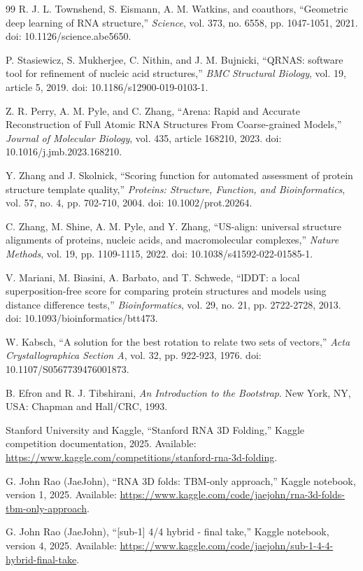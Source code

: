 \begin{thebibliography}{99}
R. J. L. Townshend, S. Eismann, A. M. Watkins, and coauthors,
``Geometric deep learning of RNA structure,''
\emph{Science}, vol. 373, no. 6558, pp. 1047-1051, 2021.
doi: 10.1126/science.abe5650.

P. Stasiewicz, S. Mukherjee, C. Nithin, and J. M. Bujnicki,
``QRNAS: software tool for refinement of nucleic acid structures,''
\emph{BMC Structural Biology}, vol. 19, article 5, 2019.
doi: 10.1186/s12900-019-0103-1.

Z. R. Perry, A. M. Pyle, and C. Zhang,
``Arena: Rapid and Accurate Reconstruction of Full Atomic RNA Structures From Coarse-grained Models,''
\emph{Journal of Molecular Biology}, vol. 435, article 168210, 2023.
doi: 10.1016/j.jmb.2023.168210.

Y. Zhang and J. Skolnick,
``Scoring function for automated assessment of protein structure template quality,''
\emph{Proteins: Structure, Function, and Bioinformatics}, vol. 57, no. 4, pp. 702-710, 2004.
doi: 10.1002/prot.20264.

C. Zhang, M. Shine, A. M. Pyle, and Y. Zhang,
``US-align: universal structure alignments of proteins, nucleic acids, and macromolecular complexes,''
\emph{Nature Methods}, vol. 19, pp. 1109-1115, 2022.
doi: 10.1038/s41592-022-01585-1.

V. Mariani, M. Biasini, A. Barbato, and T. Schwede,
``lDDT: a local superposition-free score for comparing protein structures and models using distance difference tests,''
\emph{Bioinformatics}, vol. 29, no. 21, pp. 2722-2728, 2013.
doi: 10.1093/bioinformatics/btt473.

W. Kabsch,
``A solution for the best rotation to relate two sets of vectors,''
\emph{Acta Crystallographica Section A}, vol. 32, pp. 922-923, 1976.
doi: 10.1107/S0567739476001873.

B. Efron and R. J. Tibshirani,
\emph{An Introduction to the Bootstrap}.
New York, NY, USA: Chapman and Hall/CRC, 1993.

Stanford University and Kaggle,
``Stanford RNA 3D Folding,''
Kaggle competition documentation, 2025.
Available: \url{https://www.kaggle.com/competitions/stanford-rna-3d-folding}.

G. John Rao (JaeJohn),
``RNA 3D folds: TBM-only approach,''
Kaggle notebook, version 1, 2025.
Available: \url{https://www.kaggle.com/code/jaejohn/rna-3d-folds-tbm-only-approach}.

G. John Rao (JaeJohn),
``[sub-1] 4/4 hybrid - final take,''
Kaggle notebook, version 4, 2025.
Available: \url{https://www.kaggle.com/code/jaejohn/sub-1-4-4-hybrid-final-take}.

\end{thebibliography}
